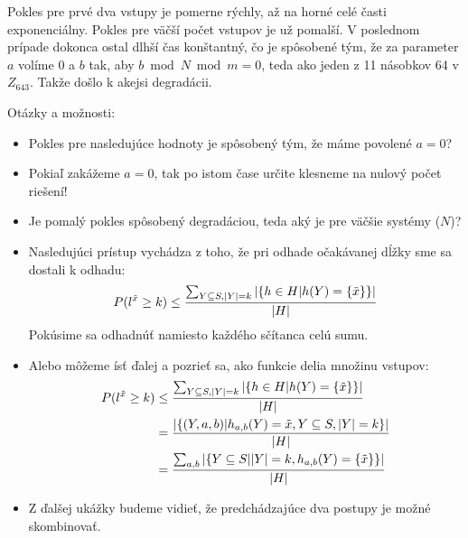 Pokles pre prvé dva vstupy je pomerne rýchly, až na horné celé časti exponenciálny. Pokles pre väčší počet vstupov je už pomalší. V poslednom prípade dokonca ostal dlhší čas konštantný, čo je spôsobené tým, že za parameter $a$ volíme 0 a $b$ tak, aby $b \bmod N \bmod m = 0$, teda ako jeden z 11 násobkov 64 v $Z_{643}$. Takže došlo k akejsi degradácii.

Otázky a možnosti:
\begin{itemize}
\item Pokles pre nasledujúce hodnoty je spôsobený tým, že máme povolené $a = 0$?
\item Pokiaľ zakážeme $a = 0$, tak po istom čase určite klesneme na nulový počet riešení!
\item Je pomalý pokles spôsobený degradáciou, teda aký je pre väčšie systémy ($N$)?
\item Nasledujúci prístup vychádza z toho, že pri odhade očakávanej dĺžky sme sa dostali k odhadu:
\begin{displaymath}
P(l^{\tilde{x}} \geq k) \leq \frac{\sum\displaylimits_{Y \subseteq S, |Y| = k} | \{ h \in H | h(Y) = \{\tilde{x}\} \}|}{|H|}
\end{displaymath}
Pokúsime sa odhadnúť namiesto každého sčítanca celú sumu.
\item Alebo môžeme ísť ďalej a pozrieť sa, ako funkcie delia množinu vstupov:
\begin{displaymath}
\begin{split}
P(l^{\tilde{x}} \geq k)
	& \leq \frac{\sum\displaylimits_{Y \subseteq S, |Y| = k} | \{ h \in H | h(Y) = \{\tilde{x}\} \}|}{|H|} \\
	& = \frac{\left|\{ (Y, a, b) | h_{a, b}(Y) = {\tilde{x}}, Y \subseteq S, |Y| = k\}\right|}{|H|} \\
	& = \frac{\sum\displaylimits_{a, b} |\{Y \subseteq S | |Y| = k, h_{a, b}(Y) = \{\tilde{x}\} \}|}{|H|}
\end{split}
\end{displaymath}
\item Z ďalšej ukážky budeme vidieť, že predchádzajúce dva postupy je možné skombinovať.
\end{itemize}


